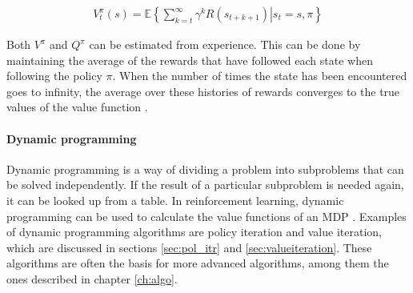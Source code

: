 \begin{align}
\label{equation:v_infinite}
V_{t}^\pi(s) = \mathbb{E} \left\{
  \left. \sum_{k=t}^\infty \gamma^k R(s_{t+k+1})
  \right\vert s_t = s,\pi
\right\}
\end{align}

Both $V^\pi$ and $Q^\pi$ can be estimated from experience. This can be done by
maintaining the average of the rewards that have followed each state when
following the policy $\pi$. When the number of times the state has been
encountered goes to infinity, the average over these histories of rewards
converges to the true values of the value function
\parencite{barto1998reinforcement}.

\paragraph{Dynamic programming}

Dynamic programming is a way of dividing a problem into subproblems that can be
solved independently. If the result of a particular subproblem is needed again,
it can be looked up from a table. In reinforcement learning, dynamic
programming can be used to calculate the value functions of an MDP
\parencite{bellman1957mdp}. Examples of dynamic programming algorithms are
policy iteration and value iteration, which are discussed in sections
\ref{sec:pol_itr} and \ref{sec:valueiteration}. These algorithms are often the
basis for more advanced algorithms, among them the ones described in chapter
\ref{ch:algo}. 



